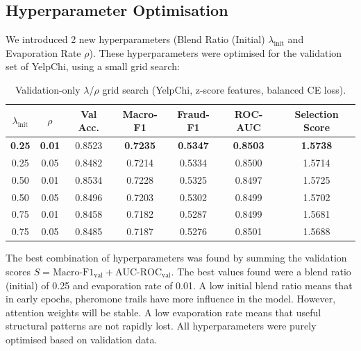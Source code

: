 \subsection{Hyperparameter Optimisation}
\label{subsec:hyperparameter_tuning}

We introduced 2 new hyperparameters (Blend Ratio (Initial) $\lambda_{\text{init}}$ and Evaporation Rate $\rho$). These hyperparameters were optimised for the validation set of YelpChi, using a small grid search:

\begin{table}[htbp]
\centering
\small
\setlength{\tabcolsep}{4pt}
\caption[$\lambda$/$\rho$ grid search results on validation]{Validation-only $\lambda$/$\rho$ grid search (YelpChi, z-score features, balanced CE loss).}
\label{tab:lambda_rho_grid}
\begin{tabular*}{\textwidth}{@{\extracolsep{\fill}}ccccccc}
\toprule
$\lambda_{\text{init}}$ & $\rho$ & \textbf{Val Acc.} & \textbf{Macro-F1} & \textbf{Fraud-F1} & \textbf{ROC-AUC} & \textbf{Selection Score} \\
\midrule
\textbf{0.25} & \textbf{0.01} & 0.8523 & \textbf{0.7235} & \textbf{0.5347} & \textbf{0.8503} & \textbf{1.5738} \\
0.25 & 0.05 & 0.8482 & 0.7214 & 0.5334 & 0.8500 & 1.5714 \\
0.50 & 0.01 & 0.8534 & 0.7228 & 0.5325 & 0.8497 & 1.5725 \\
0.50 & 0.05 & 0.8496 & 0.7203 & 0.5302 & 0.8499 & 1.5702 \\
0.75 & 0.01 & 0.8458 & 0.7182 & 0.5287 & 0.8499 & 1.5681 \\
0.75 & 0.05 & 0.8485 & 0.7187 & 0.5276 & 0.8501 & 1.5688 \\
\bottomrule
\end{tabular*}
\end{table}

The best combination of hyperparameters was found by summing the validation scores $S = \text{Macro-F1}_{\text{val}} + \text{AUC-ROC}_{\text{val}}$. The best values found were a blend ratio (initial) of 0.25 and evaporation rate of 0.01. A low initial blend ratio means that in early epochs, pheromone trails have more influence in the model. However, attention weights will be stable. A low evaporation rate means that useful structural patterns are not rapidly lost. All hyperparameters were purely optimised based on validation data.


